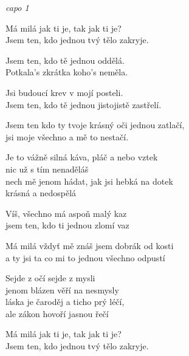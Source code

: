 \re{}\textit{capo 1}

\re{}
Má milá jak ti je, tak jak ti je?\\
Jsem ten, kdo jednou tvý tělo zakryje. 

\re{}
Jsem ten, kdo tě jednou oddělá.\\
Potkala's zkrátka koho's neměla.

\re{}
Jsi budoucí krev v mojí posteli.\\
Jsem ten, kdo tě jednou jistojistě zastřelí.

\re{}
Jsem ten kdo ty tvoje krásný oči jednou zatlačí,\\
jsi moje všechno a mě to nestačí.

\cho{}
Je to vážně silná káva, pláč a nebo vztek\\
nic už s tím nenaděláš\\
nech mě jenom hádat, jak jsi hebká na dotek\\
krásná a nedospělá

\re{}
Víš, všechno má aspoň malý kaz\\
jsem ten, kdo ti jednou zlomí vaz

\re{}
Má milá vždyť mě znáš jsem dobrák od kosti\\
a ty jsi ta co mi to jednou všechno odpustí

\re{*:}
Sejde z očí sejde z mysli\\
jenom blázen věří na nesmysly\\
láska je čaroděj a ticho prý léčí,\\
ale zákon hovoří jasnou řečí

\cho

\re{}
Má milá jak ti je, tak jak ti je?\\
Jsem ten, kdo jednou tvý tělo zakryje. 

\esong{}